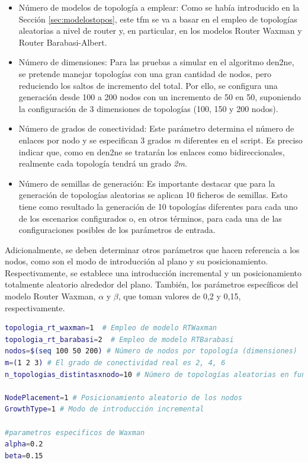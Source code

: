 \begin{itemize}
    \item Número de modelos de topología a emplear: Como se había introducido en la Sección \ref{sec:modelostopos}, este \gls{tfm} se va a basar en el empleo de topologías aleatorias a nivel de router y, en particular, en los modelos Router Waxman y Router Barabasi-Albert. 
    \item Número de dimensiones: Para las pruebas a simular en el algoritmo \gls{den2ne}, se pretende manejar topologías con una gran cantidad de nodos, pero reduciendo los saltos de incremento del total. Por ello, se configura una generación desde 100 a 200 nodos con un incremento de 50 en 50, suponiendo la configuración de 3 dimensiones de topologías (100, 150 y 200 nodos). 
    \item Número de grados de conectividad: Este parámetro determina el número de enlaces por nodo y se especifican 3 grados \textit{m} diferentes en el script. Es preciso indicar que, como en \gls{den2ne} se tratarán los enlaces como bidireccionales, realmente cada topología tendrá un grado \textit{2m}.
    \item Número de semillas de generación: Es importante destacar que para la generación de topologías aleatorias se aplican 10 ficheros de semillas. Esto tiene como resultado la generación de 10 topologías diferentes para cada uno de los escenarios configurados o, en otros términos, para cada una de las configuraciones posibles de los parámetros de entrada.
\end{itemize}

\vspace{3mm}

Adicionalmente, se deben determinar otros parámetros que hacen referencia a los nodos, como son el modo de introducción al plano y su posicionamiento. Respectivamente, se establece una introducción incremental y un posicionamiento totalmente aleatorio alrededor del plano. También, los parámetros específicos del modelo Router Waxman, $\alpha$ y $\beta$, que toman valores de 0,2 y 0,15, respectivamente.

\vspace{3mm}

\begin{lstlisting}[language=bash, style=Consola, caption={Configuración de los parámetros de entrada en el script de automatización de \acrshort{brite}}]
topologia_rt_waxman=1  # Empleo de modelo RTWaxman
topologia_rt_barabasi=2  # Empleo de modelo RTBarabasi
nodos=$(seq 100 50 200) # Número de nodos por topología (dimensiones)
m=(1 2 3) # El grado de conectividad real es 2, 4, 6
n_topologias_distintasxnodo=10 # Número de topologías aleatorias en función del número de semillas

NodePlacement=1 # Posicionamiento aleatorio de los nodos
GrowthType=1 # Modo de introducción incremental

#parametros especificos de Waxman
alpha=0.2
beta=0.15
\end{lstlisting}

